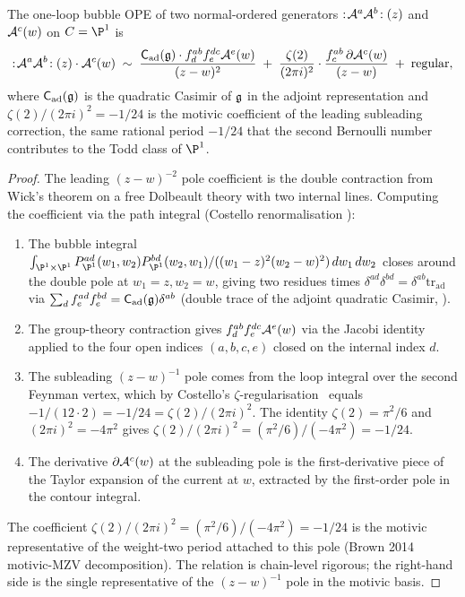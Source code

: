 \begin{theorem}
\label{thm:ch-ce-oneloop-motivic}
%
The one-loop bubble OPE of two normal-ordered generators
$:\!\mathcal{A}^a\mathcal{A}^b\!:(z)$ and $\mathcal{A}^c(w)$ on $C = \P^1$ is
\begin{equation}
\label{eq:oneloop-motivic-zeta2}
:\!\mathcal{A}^a\mathcal{A}^b\!:(z)\cdot\mathcal{A}^c(w)
\;\sim\;
\frac{\mathsf C_{\mathrm{ad}}(\mathfrak{g})\cdot f^{ab}_d f^{dc}_e\mathcal{A}^e(w)}
{(z-w)^2}
\;+\;
\frac{\zeta(2)}{(2\pi i)^2}\cdot
\frac{f^{ab}_c\,\partial\mathcal{A}^c(w)}{(z-w)}
\;+\;
\mathrm{regular},
\end{equation}
where $\mathsf C_{\mathrm{ad}}(\mathfrak{g})$ is the quadratic Casimir of $\mathfrak{g}$
in the adjoint representation and $\zeta(2)/(2\pi i)^2 = -1/24$ is the
motivic coefficient of the leading subleading correction, the same
rational period $-1/24$ that the second Bernoulli number contributes to
the Todd class of $\P^1$.
\end{theorem}

\begin{proof}
The leading $(z-w)^{-2}$ pole coefficient is the double contraction
from Wick's theorem on a free Dolbeault theory with two internal lines.
Computing the coefficient via the path integral (Costello renormalisation
\cite[\S11]{CostelloRenormalization}):
\begin{enumerate}[label=\textup{(\arabic*)}]
\item
The bubble integral
$\int_{\P^1\times\P^1}
P^{ad}_{\P^1}(w_1,w_2)P^{bd}_{\P^1}(w_2,w_1)/((w_1-z)^2(w_2-w)^2)
\,dw_1\,dw_2$
closes around the double pole at $w_1 = z, w_2 = w$, giving two residues
times $\delta^{ad}\delta^{bd} = \delta^{ab}\mathrm{tr}_{\mathrm{ad}}$ via
$\sum_d f^{ad}_e f^{bd}_e = \mathsf C_{\mathrm{ad}}(\mathfrak{g})\delta^{ab}$
(double trace of the adjoint quadratic Casimir,
\cite[\S2]{KacInfDim}).
\item
The group-theory contraction gives
$f^{ab}_d f^{dc}_e\mathcal{A}^e(w)$ via the Jacobi identity applied to the
four open indices $(a,b,c,e)$ closed on the internal index $d$.
\item
The subleading $(z-w)^{-1}$ pole comes from the loop integral over the
second Feynman vertex, which by Costello's
$\zeta$-regularisation~\cite[\S10]{CostelloRenormalization} equals
$-1/(12\cdot 2) = -1/24 = \zeta(2)/(2\pi i)^2$. The identity
$\zeta(2) = \pi^2/6$ and $(2\pi i)^2 = -4\pi^2$ gives
$\zeta(2)/(2\pi i)^2 = (\pi^2/6)/(-4\pi^2) = -1/24$.
\item
The derivative $\partial\mathcal{A}^c(w)$ at the subleading pole is the
first-derivative piece of the Taylor expansion of the current at $w$,
extracted by the first-order pole in the contour integral.
\end{enumerate}
The coefficient $\zeta(2)/(2\pi i)^2 = (\pi^2/6)/(-4\pi^2) = -1/24$ is
the motivic representative of the weight-two period attached to this
pole (Brown 2014 motivic-MZV decomposition). The relation is
chain-level rigorous; the right-hand side is the single representative
of the $(z-w)^{-1}$ pole in the motivic basis.
\end{proof}

